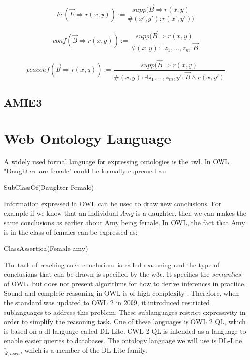 \[hc(\vec{B}\Rightarrow r(x, y)) := \frac{supp(\vec{B}\Rightarrow r(x, y)}{ \#(x', y'):r(x', y'))}\]

\[conf(\vec{B}\Rightarrow r(x, y)) := \frac{supp(\vec{B}\Rightarrow r(x, y)}{\#(x, y):\exists z_1 ,..., z_m : \vec{B}}\]

\[pcaconf(\vec{B}\Rightarrow r(x, y)) := \frac{supp(\vec{B}\Rightarrow r(x, y)}{\#(x, y):\exists z_1 ,..., z_m, y' : \vec{B} \wedge r(x, y')}\]


\subsection{AMIE3}

\iffalse 
\section{Web Ontology Language}
A widely used formal language for expressing ontologies is the \gls{owl}. In OWL "Daughters are female" could be formally expressed as:

\centerline{\textsf{SubClassOf(Daughter Female)}}
Information expressed in OWL can be used to draw new conclusions. For example if we know that an individual \emph{Amy} is a daughter, then we can makes the same conclusions as earlier about Amy being female. In OWL, the fact that Amy is in the class of females can be expressed as:

\centerline{\textsf{ClassAssertion(Female amy)}}
The task of reaching such conclusions is called reasoning and the type of conclusions that can be drawn is specified by the \gls{w3c}. It specifies the \emph{semantics} of OWL, but does not present algorithms for how to derive inferences in practice. Sound and complete reasoning in OWL is of high complexity \cite{Krotzsch2012}. Therefore, when the standard was updated to OWL 2 in 2009, it introduced restricted sublanguages to address this problem. These sublanguages restrict expressivity in order to simplify the reasoning task. One of these languages is OWL 2 QL, which is based on a \gls{dl} language called DL-Lite. OWL 2 QL is intended as a language to enable easier queries to databases. The ontology language we will use is DL-Lite$_{\mathcal{R}, horn}^{\exists}$, which is a member of the DL-Lite family.



